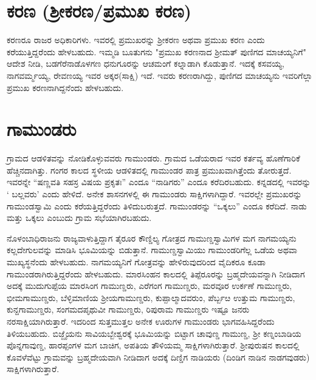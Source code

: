 \section{ಕರಣ (ಶ‍್ರೀಕರಣ/ಪ್ರಮುಖ ಕರಣ)}

ಕರಣರೂ ರಾಜರ ಅಧಿಕಾರಿಗಳು. ಇವರಲ್ಲಿ ಪ್ರಮುಖರನ್ನು ಶ‍್ರೀಕರಣ ಅಥವಾ ಪ್ರಮುಖ ಕರಣ ಎಂದು ಕರೆಯುತ್ತಿದ್ದರೆಂದು ಹೇಳಬಹುದು. ಇಮ್ಮಡಿ ಬೂತುಗನು "ಪ್ರಮುಖ ಕರಣನಾದ ಶ‍್ರೀಮತ್​ ಪುಣಿಗದ ಮಾಚಯ್ಯನಿಗೆ" ಆದೇಶ ನೀಡಿ, ಬಡಗೆರೆನಾಡೊಳಗಣ ಧನುಗೂರನ್ನು ಆಚಮಂಗೆ ಕಲ್ನಾಡಾಗಿ ಕೊಡುತ್ತಾನೆ. ಇದಕ್ಕೆ ಕಸವಯ್ಯ, ನಾಗವರ್ಮ್ಮಯ್ಯ, ರೇವಣಯ್ಯ ಇವರ ಅಕ್ಕರ(ಸಾಕ್ಷಿ) ಇದೆ. ಇವರು ಕರಣರಾಗಿದ್ದು, ಪುಣಿಗದ ಮಾಚಯ್ಯನು ಇವರಿಗೆಲ್ಲಾ ಪ್ರಮುಖ ಕರಣನಾಗಿದ್ದನೆಂದು ಹೇಳಬಹುದು.

\section{ಗಾಮುಂಡರು}

ಗ್ರಾಮದ ಆಡಳಿತವನ್ನು ನೋಡಿಕೊಳ್ಳುವವರು ಗಾಮುಂಡರು. ಗ್ರಾಮದ ಒಡೆಯರಾದ ಇವರ ಕರ್ತವ್ಯ ಹೊಣೆಗಾರಿಕೆ ಹೆಚ್ಚಿನದಾಗಿತ್ತು. ಗಂಗರ ಕಾಲದ ಸ್ಥಳೀಯ ಆಡಳಿತದಲ್ಲಿ ಗಾಮುಂಡರ ಪಾತ್ರ ಪ್ರಮುಖವಾಗಿತ್ತೆಂದು ತೋರುತ್ತದೆ. ಇವರನ್ನೇ “ಷಣ್ಣವತಿ ಸಹಸ್ರ ವಿಷಯ ಪ್ರಕೃತಃ” ಎಂದೂ “ನಾಡಿಗರು” ಎಂದೂ ಕರೆದಿರಬಹುದು. ಕನ್ನಡದಲ್ಲಿ ಇವರನ್ನು ` ಬಲ್ಲವರು' ಎಂದು ಹೇಳಿದೆ. ಅನೇಕ ಶಾಸನಗಳಲ್ಲಿ ಈ ಗಾಮುಂಡರು ಸಾಕ್ಷಿಗಳಾಗಿದ್ದಾರೆ. ಇವರಲ್ಲೇ ಪ್ರಮುಖರನ್ನು ಗಾಮುಂಡಸ್ವಾಮಿ ಎಂದು ಕರೆಯತ್ತಿದ್ದರೆಂದು ತಿಳಿದುಬರುತ್ತದೆ. ಗಾಮುಂಡರನ್ನು “ಒಕ್ಕಲು” ಎಂದೂ ಕರೆದಿದೆ. ನಾಡು ಮತ್ತು ಒಕ್ಕಲು ಎಂಬುದು ಗ್ರಾಮ ಸಭೆಯಾಗಿರಬಹುದು.

ನೊಳಂಬಾಧಿರಾಜನು ರಾಜ್ಯವಾಳುತ್ತಿದ್ದಾಗ ತೈರೂರ ಕೌಣ್ಡಿಲ್ಯ ಗೋತ್ರದ ಗಾಮುಣ್ಡಸ್ವಾಮಿಗಳ ಮಗ ನಾಗಮಯ್ಯನು ಕಲ್ಲದೇಗುಲವನ್ನು ಮಾಡಿಸಿ ಭೂಮಿಯನ್ನು ಬಿಡುತ್ತಾನೆ. ಗಾಮುಣ್ಡಸ್ವಾಮಿಯು ಗಾಮುಂಡರಿಗೆಲ್ಲ ಒಡೆಯ ಅಥವಾ ಮುಖ್ಯಸ್ಥನೆಂದು ಹೇಳಬಹುದು. ನಾಗಮಯ್ಯನಿಗೆ ಗೋತ್ರವನ್ನು ಹೇಳಿರುವುದರಿಂದ ವೈದಿಕರೂ ಕೂಡಾ ಗಾಮುಂಡರಾಗಿರು\-ತ್ತಿದ್ದರೆಂದು ಹೇಳಬಹುದು. ಮಾರಸಿಂಹನ ಕಾಲದಲ್ಲಿ ತಿಪ್ಪೆರೂರನ್ನು ಬ್ರಹ್ಮದೇಯವನ್ನಾಗಿ ನೀಡಿದಾಗ ಅದಕ್ಕೆ ಮುದುಗುಪ್ಪೆಯ ಮಾರಸಿಂಗ ಗಾಮುಣ್ಡರು, ಎರೆಗಂಗ ಗಾಮುಣ್ಡರು, ಮರವೂರ ಉರ್ಕಣೆ ಗಾಮುಣ್ಡರು, ಭೀಮಗಾಮುಣ್ಡರು, ಬೆಳ್ಳಿಮಾಣಿಯ ಶ‍್ರೀಯಗಾಮುಣ್ಡರು, ಕುಪ್ಪಾಲ್ಮಾದವರುಂ, ಪೆರ್ಬ್ಬೞ ಉತ್ತುಮ ಗಾಮುಣ್ಡರು, ಕುನ್ದಗಾಮುಣ್ಡರು, ಸಂಗಮದ\break ಪೃಥುವೀ ಗಾಮುಣ್ಡರು, ರಿಪುರಾಮ ಗಾಮುಣ್ಡರು ಇಷ್ಟೂ ಜನರು ನರಸಾಕ್ಷಿಯಾಗಿರುತ್ತಾರೆ. ಇದರಿಂದ ಸುತ್ತಮುತ್ತಲ ಅನೇಕ ಊರುಗಳ ಗಾಮುಂಡರು ಭಾಗವಹಿಸಿದ್ದರೆಂದು ತಿಳಿಯಬಹುದು. ಬಿಜ್ಜೈಯನು ಸಾವಿಯಬ್ಬೇಶ್ವರಕ್ಕೆ ಭೂಮಿಯನ್ನು ಬಿಟ್ಟಾಗ ಚಾವುಣ್ಡ ಗಾಮುಣ್ಡ, ಶ‍್ರೀ ಕಣ್ನಂಬಾಡಿಯ ಪೊನ್ನಗಾವುಣ್ಡ, ಹಾರಪ್ಪಂಗಳ ಮಗ ಬಾಚಿಗ, ಅಪತಿಯ ತೌಳಿಯಮ್ಮ ಸಾಕ್ಷಿಗಳಾಗಿರುತ್ತಾರೆ. ಶ‍್ರೀಪುರುಷನ ಕಾಲದಲ್ಲಿ ಕೊವಳೆವೆಟ್ಟು ಗ್ರಾಮವನ್ನು ಬ್ರಹ್ಮದೇಯವಾಗಿ ನೀಡಿದಾಗ ಅದಕ್ಕೆ ದಿಣ್ಡಿಗ ನಾಡಿಯರು (ದಿಂಡಿಗ ನಾಡಿನ ನಾಡಗವುಡರು) ಸಾಕ್ಷಿಗಳಾಗಿರುತ್ತಾರೆ.


